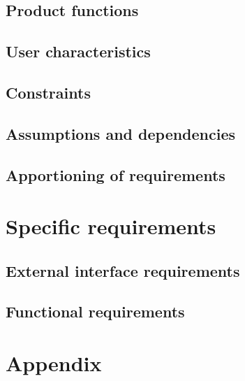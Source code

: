 \documentclass[]{report}
\begin{document}
\section{Product functions}


\section{User characteristics}


\section{Constraints}


\section{Assumptions and dependencies}


\section{Apportioning of requirements}


\chapter{Specific requirements}

\section{External interface requirements}


\section{Functional requirements}




\appendix

\chapter{Appendix}
\end{document}
